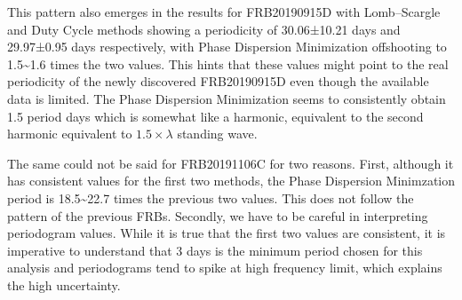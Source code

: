 \documentclass[
  rmp,
  amsmath,
  amssymb,
  preprint]{revtex4-2}
\begin{document}
This pattern also emerges in the results for FRB20190915D with
Lomb--Scargle and Duty Cycle methods showing a periodicity of
30.06±10.21 days and 29.97±0.95 days respectively, with Phase Dispersion
Minimization offshooting to 1.5\textasciitilde1.6 times the two values.
This hints that these values might point to the real periodicity of the
newly discovered FRB20190915D even though the available data is limited.
The Phase Dispersion Minimization seems to consistently obtain 1.5
\times period days which is somewhat like a harmonic, equivalent to the
second harmonic equivalent to \(1.5\times \lambda\) standing wave.

The same could not be said for FRB20191106C for two reasons. First,
although it has consistent values for the first two methods, the Phase
Dispersion Minimzation period is 18.5\textasciitilde22.7 times the
previous two values. This does not follow the pattern of the previous
FRBs. Secondly, we have to be careful in interpreting periodogram
values. While it is true that the first two values are consistent, it is
imperative to understand that 3 days is the minimum period chosen for
this analysis and periodograms tend to spike at high frequency limit,
which explains the high uncertainty.
\end{document}
